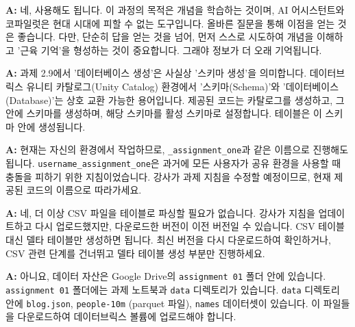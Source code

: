 \documentclass[11pt,a4paper]{article}
\theoremstyle{definition}
\newcommand{\code}[1]{\texttt{#1}}
\begin{document}
\begin{tcolorbox}[summary, title=Q: 과제에서 AI 어시스턴트(예: Databricks AI Assistant)를 사용해도 되나요?]
\textbf{A:} 네, 사용해도 됩니다. 이 과정의 목적은 개념을 학습하는 것이며, AI 어시스턴트와 코파일럿은 현대 시대에 피할 수 없는 도구입니다. 올바른 질문을 통해 이점을 얻는 것은 좋습니다. 다만, 단순히 답을 얻는 것을 넘어, 먼저 스스로 시도하여 개념을 이해하고 '근육 기억'을 형성하는 것이 중요합니다. 그래야 정보가 더 오래 기억됩니다.
\end{tcolorbox}

\begin{tcolorbox}[summary, title=Q: 과제 2.9에서 '데이터베이스 생성'이 무엇을 의미하나요? 스키마와 데이터베이스의 차이는 무엇인가요?]
\textbf{A:} 과제 2.9에서 '데이터베이스 생성'은 사실상 '스키마 생성'을 의미합니다. 데이터브릭스 유니티 카탈로그(Unity Catalog) 환경에서 '스키마(Schema)'와 '데이터베이스(Database)'는 상호 교환 가능한 용어입니다. 제공된 코드는 카탈로그를 생성하고, 그 안에 스키마를 생성하며, 해당 스키마를 활성 스키마로 설정합니다. 테이블은 이 스키마 안에 생성됩니다.
\end{tcolorbox}

\begin{tcolorbox}[summary, title=Q: 과제에서 데이터베이스 이름을 \code{\_assignment\_one} 대신 \code{username\_assignment\_one}으로 해야 한다고 되어 있는데, 어떻게 해야 하나요?]
\textbf{A:} 현재는 자신의 환경에서 작업하므로, \code{\_assignment\_one}과 같은 이름으로 진행해도 됩니다. \code{username\_assignment\_one}은 과거에 모든 사용자가 공유 환경을 사용할 때 충돌을 피하기 위한 지침이었습니다. 강사가 과제 지침을 수정할 예정이므로, 현재 제공된 코드의 이름으로 따라가세요.
\end{tcolorbox}

\begin{tcolorbox}[summary, title=Q: 제 과제 2.9 내용이 강사님이 보여주신 것과 다릅니다. CSV 파일을 테이블로 파싱하라는 내용이 있는데, 더 이상 하지 않나요?]
\textbf{A:} 네, 더 이상 CSV 파일을 테이블로 파싱할 필요가 없습니다. 강사가 지침을 업데이트하고 다시 업로드했지만, 다운로드한 버전이 이전 버전일 수 있습니다. CSV 테이블 대신 델타 테이블만 생성하면 됩니다. 최신 버전을 다시 다운로드하여 확인하거나, CSV 관련 단계를 건너뛰고 델타 테이블 생성 부분만 진행하세요.
\end{tcolorbox}

\begin{tcolorbox}[summary, title=Q: 데이터 자산(data assets)은 어디서 찾을 수 있나요? 온라인에서 직접 찾아야 하나요?]
\textbf{A:} 아니요, 데이터 자산은 Google Drive의 \code{assignment 01} 폴더 안에 있습니다. \code{assignment 01} 폴더에는 과제 노트북과 \code{data} 디렉토리가 있습니다. \code{data} 디렉토리 안에 \code{blog.json}, \code{people-10m} (parquet 파일), \code{names} 데이터셋이 있습니다. 이 파일들을 다운로드하여 데이터브릭스 볼륨에 업로드해야 합니다.
\end{tcolorbox}
\end{document}
